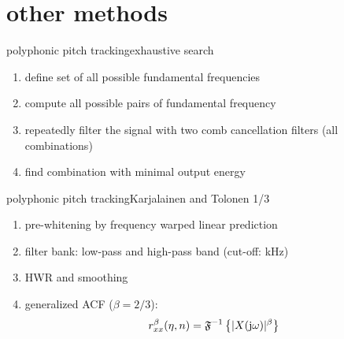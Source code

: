     \section[other]{other methods}
	\begin{frame}{polyphonic pitch tracking}{exhaustive search}
		\begin{enumerate}
			\item	define set of all possible fundamental frequencies
			\pause
			\item	compute all possible pairs of fundamental frequency
			\pause
			\item 	repeatedly filter the signal with two comb cancellation filters (all combinations)
			\pause
			\item	find combination with minimal output energy
		\end{enumerate}
	\end{frame}
	
	\begin{frame}{polyphonic pitch tracking}{Karjalainen and Tolonen 1/3}
		\begin{enumerate}
			\item	pre-whitening by frequency warped linear prediction
			\pause
			\item	filter bank: low-pass and high-pass band (cut-off: \unit[1]{kHz})
			\pause
			\item 	HWR and smoothing
			\pause
			\item	generalized ACF ($\beta = 2/3$):
						\begin{equation*}
							r_{xx}^\beta (\eta,n) = \mathfrak{F}^{-1}\left\{|X(\mathrm{j}\omega)|^\beta\right\} 
						\end{equation*}
		\end{enumerate}
	\end{frame}
	
